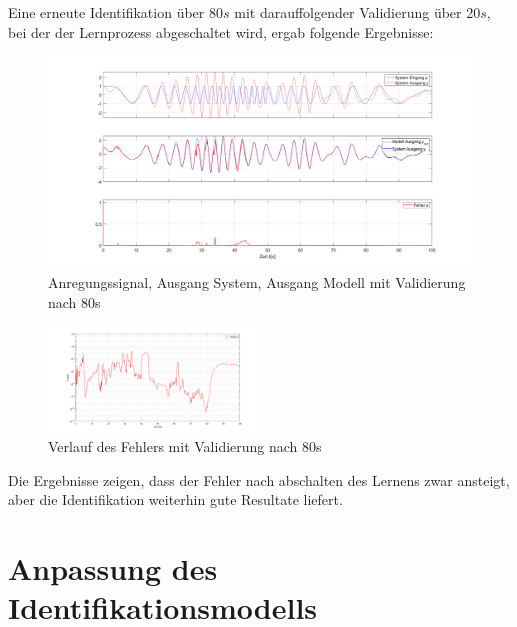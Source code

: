 \documentclass[paper=a4, fontsize=11pt]{scrartcl} %
\numberwithin{equation}{section} %
\numberwithin{figure}{section} %
\numberwithin{table}{section} %
\begin{document}
Eine erneute Identifikation über 80$s$ mit darauffolgender Validierung über 20$s$, bei der der Lernprozess abgeschaltet wird, ergab folgende Ergebnisse: 
\begin{figure}[!h]
	\centering
		\includegraphics[width=1.00\textwidth]{./Q_500_nice_results_double_chirp_validierung_80.png}
	\caption{Anregungssignal, Ausgang System, Ausgang Modell mit Validierung nach 80s}
	\label{fig:Validierung}
\end{figure}

\begin{figure}[!h]
	\centering
		\includegraphics[width=0.5\textwidth]{./Q_500_nice_results_double_chirp_validierung_80_2.png}
	\caption{Verlauf des Fehlers mit Validierung nach 80s}
	\label{fig:Validierung2}
\end{figure}

Die Ergebnisse zeigen, dass der Fehler nach abschalten des Lernens zwar ansteigt, aber die Identifikation weiterhin gute Resultate liefert.
\newpage

\section{Anpassung des Identifikationsmodells}

\end{document}
